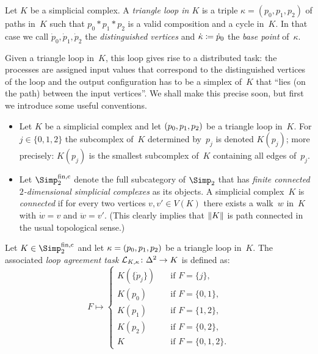 \begin{thDef}
    Let $K$ be a simplicial complex.
    A \emph{triangle loop in $K$} is a triple $\kappa = (p_0,p_1,p_2)$ of paths
    in~$K$ such that $p_0\ast p_1\ast p_2$ is a valid composition and a cycle
    in~$K$. In that case we call $\dot{p}_0,\dot{p}_1,\dot{p}_2$ the
    \emph{distinguished vertices} and $\dot\kappa \coloneqq \dot{p}_0$ the
    \emph{base point} of~$\kappa$.
\end{thDef}

Given a triangle loop in~$K$, this loop gives rise to a distributed task:
the processes are assigned input values that correspond to the distinguished
vertices of the loop and the output configuration has to be a simplex of~$K$
that \enquote{lies (on the path) between the input vertices}. We shall make this
precise soon, but first we introduce some useful conventions.

\begin{thConvention}\hfill
    \begin{itemize}
        \item
            Let $K$ be a simplicial complex and let $(p_0,p_1,p_2)$ be a triangle loop
            in~$K$. For $j\in\{0,1,2\}$ the subcomplex of~$K$ determined
            by~$p_j$ is denoted $K(p_j)$; more precisely: $K(p_j)$ is the
            smallest subcomplex of~$K$ containing all edges of~$p_j$.
            
        \item
            Let $\finSimp$ denote the full subcategory of $\Simp_2$ that has
            \emph{finite connected $2$-dimensional simplicial complexes} as its
            objects. A simplicial complex~$K$ is \emph{connected} if for
            every two vertices $v,v'\in V(K)$ there exists a walk~$w$ in~$K$
            with $\dot w = v$ and $\ddot w = v'$. (This clearly implies that
            $\lVert K\rVert$ is path connected in the usual topological sense.)
    \end{itemize}
\end{thConvention}

\begin{thDef}
    Let $K\in\finSimp$ and let $\kappa = (p_0,p_1,p_2)$ be a triangle loop in~$K$. The
    associated \emph{loop agreement task $\mathcal{L}_{K,\kappa}\colon\Delta^2 \to K$}
    is defined as:
    \[
        F \mapsto \begin{cases}
            K(\{\dot{p}_j\}) &\quad \text{if } F = \{j\},   \\
            K(p_0)           &\quad \text{if } F = \{0,1\}, \\
            K(p_1)           &\quad \text{if } F = \{1,2\}, \\
            K(p_2)           &\quad \text{if } F = \{0,2\}, \\
            K             &\quad \text{if } F = \{0,1,2\}
        . \end{cases}
    \]
\end{thDef}
%

